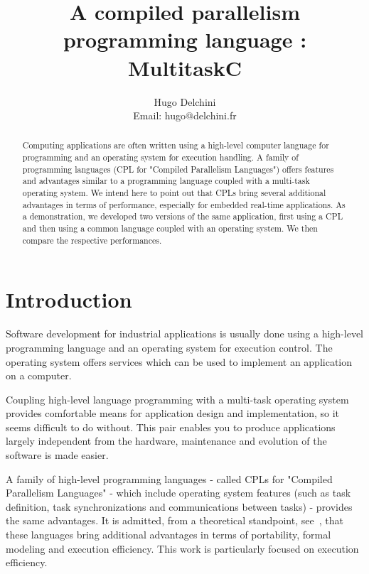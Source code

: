 \documentclass[10pt]{report}
\begin{document}
\title{A compiled parallelism programming language : MultitaskC}

\author{
Hugo Delchini\\
Email: hugo@delchini.fr\\
}

\maketitle
\thispagestyle{empty}

\begin{abstract}

Computing applications are often written using a high-level
computer language for programming and an operating system for
execution handling. A family of programming languages (CPL for
"Compiled Parallelism Languages") offers features and advantages
similar to a programming language coupled with a multi-task
operating system. We intend here to point out that CPLs bring
several additional advantages in terms of performance, especially
for embedded real-time applications. As a demonstration, we
developed two versions of the same application, first using a CPL
and then using a common language coupled with an operating
system. We then compare the respective performances.

\end{abstract}

\tableofcontents

\chapter{Introduction}
\label{sec:intro}

Software development for industrial applications is usually done
using a high-level programming language and an operating system
for execution control. The operating system offers services which
can be used to implement an application on a computer.

Coupling high-level language programming with a multi-task
operating system provides comfortable means for application
design and implementation, so it seems difficult to do
without. This pair enables you to produce applications largely
independent from the hardware, maintenance and evolution of the
software is made easier.

A family of high-level programming languages - called CPLs for
"Compiled Parallelism Languages" - which include operating system
features (such as task definition, task synchronizations and
communications between tasks) - provides the same advantages. It is
admitted, from a theoretical standpoint, see~\cite{Halbwachs:91}, that
these languages bring additional advantages in terms of
portability, formal modeling and execution efficiency. This work
is particularly focused on execution efficiency.
\end{document}
